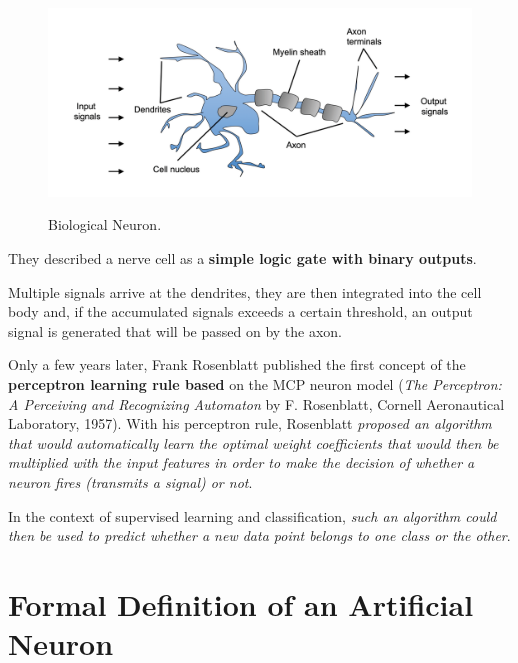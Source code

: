 \documentclass[../machine_learning_scikit.tex]{subfiles}
\begin{document}
    \begin{figure}[h]
        \begin{minipage}{\textwidth}
            \centering
            \includegraphics[scale=1]{images/nerve_cell.png} \\
            \caption{Biological Neuron.}
            \label{figure:biological_neuron}
        \end{minipage}
    \end{figure}

    \begin{idea}
        They described a nerve cell as a \textbf{simple logic gate with binary outputs}.
    \end{idea}

    Multiple signals arrive at the dendrites, they are then integrated into the cell body and, if the accumulated signals exceeds a certain threshold, an output signal is generated that will be passed on by the axon.

    \begin{obs}
        Only a few years later, Frank Rosenblatt published the first concept of the \textbf{perceptron learning rule based} on the MCP neuron model (\textit{The Perceptron: A Perceiving and Recognizing Automaton} by F. Rosenblatt, Cornell Aeronautical Laboratory, 1957). With his perceptron rule, Rosenblatt \textit{proposed an algorithm that would automatically learn the optimal weight coefficients that would then be multiplied with the input features in order to make the decision of whether a neuron fires (transmits a signal) or not}.
    \end{obs}

    In the context of supervised learning and classification, \textit{such an algorithm could then be used to predict whether a new data point belongs to one class or the other}.

    \section{Formal Definition of an Artificial Neuron}
\end{document}

